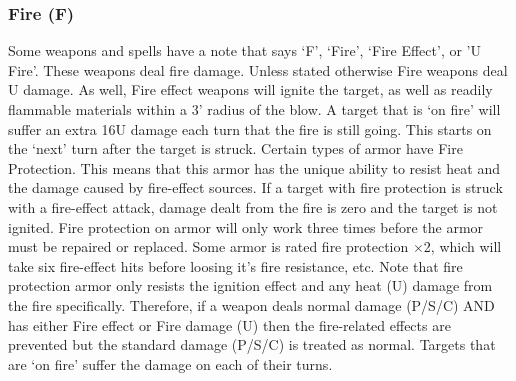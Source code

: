 \documentclass[twoside]{book}
\begin{document}
\subsubsection{Fire (F)}
     Some weapons and spells have a note that says
                 `F', `Fire', `Fire
                 Effect', or 'U Fire'. These weapons
                 deal fire damage. Unless stated otherwise Fire weapons
                 deal U damage. As well, Fire effect weapons will ignite
                 the target, as well as readily flammable materials
                 within a 3' radius of the blow. A target that is
                 `on fire' will suffer an extra 16U damage
                 each turn that the fire is still going. This starts on
                 the `next' turn after the target is struck.
                 Certain types of armor have Fire Protection. This means
                 that this armor has the unique ability to resist heat
                 and the damage caused by fire-effect sources. If a
                 target with fire protection is struck with a fire-effect
                 attack, damage dealt from the fire is zero and the
                 target is not ignited. Fire protection on armor will
                 only work three times before the armor must be repaired
                 or replaced. Some armor is rated fire protection
                 \ensuremath{\times}2, which will take six fire-effect hits before
                 loosing it's fire resistance, etc. Note that fire
                 protection armor only resists the ignition effect and
                 any heat (U) damage from the fire specifically.
                 Therefore, if a weapon deals normal damage (P/S/C) AND
                 has either Fire effect or Fire damage (U) then the
                 fire-related effects are prevented but the standard
                 damage (P/S/C) is treated as normal. Targets that are
                 `on fire' suffer the damage on each of their
                 turns. 
  
  
\end{document}
